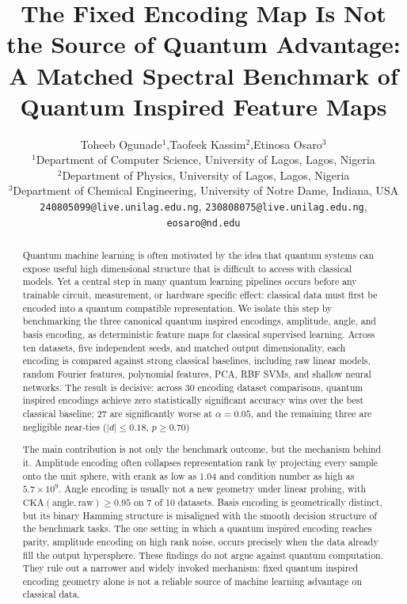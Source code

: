 \documentclass[12pt]{article}
\title{%
  \textbf{The Fixed Encoding Map Is Not the Source of Quantum Advantage:
  A Matched Spectral Benchmark of Quantum Inspired Feature Maps}%
}
\author{%
  Toheeb Ogunade$^{1}$,\quad Taofeek Kassim$^{2}$,\quad Etinosa Osaro$^{3}$\\[0.5em]
  \small$^{1}$Department of Computer Science, University of Lagos, Lagos, Nigeria\\
  \small$^{2}$Department of Physics, University of Lagos, Lagos, Nigeria\\
  \small$^{3}$Department of Chemical Engineering, University of Notre Dame, Indiana, USA\\[0.3em]
  \small\texttt{240805099@live.unilag.edu.ng},\quad
  \texttt{230808075@live.unilag.edu.ng},\quad
  \texttt{eosaro@nd.edu}
}
\date{}
\newcommand{\erank}{\mathrm{erank}}
\begin{document}
\maketitle

\begin{abstract}

Quantum machine learning is often motivated by the idea that quantum systems
can expose useful high dimensional structure that is difficult to access with
classical models. Yet a central step in many quantum learning pipelines occurs
before any trainable circuit, measurement, or hardware specific effect:
classical data must first be encoded into a quantum compatible representation.
We isolate this step by benchmarking the three canonical quantum inspired
encodings, amplitude, angle, and basis encoding, as deterministic feature maps
for classical supervised learning. Across ten datasets, five independent seeds,
and matched output dimensionality, each encoding is compared against strong
classical baselines, including raw linear models, random Fourier features,
polynomial features, PCA, RBF SVMs, and shallow neural networks. The result is
decisive: across 30 encoding dataset comparisons, quantum inspired encodings
achieve zero statistically significant accuracy wins over the best classical
baseline; 27 are significantly worse at $\alpha=0.05$, and the remaining three are negligible near-ties ($|d|\leq0.18$, $p\geq0.70$)

The main contribution is not only the benchmark outcome, but the mechanism
behind it. Amplitude encoding often collapses representation rank by projecting
every sample onto the unit sphere, with $\erank$ as low as 1.04 and condition
number as high as $5.7\times10^9$. Angle encoding is usually not a new geometry
under linear probing, with $\mathrm{CKA}(\mathrm{angle},\mathrm{raw})\geq0.95$
on 7 of 10 datasets. Basis encoding is geometrically distinct, but its binary
Hamming structure is misaligned with the smooth decision structure of the
benchmark tasks. The one setting in which a quantum inspired encoding reaches
parity, amplitude encoding on high rank noise, occurs precisely when the data
already fill the output hypersphere. These findings do not argue against
quantum computation. They rule out a narrower and widely invoked mechanism:
fixed quantum inspired encoding geometry alone is not a reliable source of
machine learning advantage on classical data.

\end{abstract}
\end{document}
